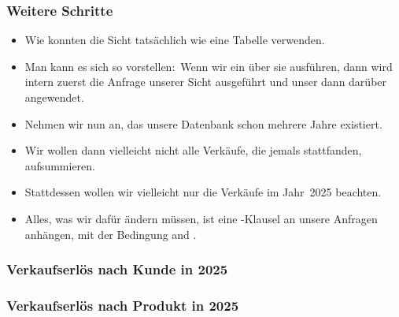 \documentclass[aspectratio=169,mathserif,notheorems]{beamer}%
\begin{document}
\begin{frame}%
\frametitle{Weitere Schritte}%
\begin{itemize}%
\item Wie konnten die Sicht tatsächlich wie eine Tabelle verwenden.%
\item<2-> Man kann es sich so vorstellen:~Wenn wir ein  über sie ausführen, dann wird intern zuerst die Anfrage unserer Sicht ausgeführt und unser  dann darüber angewendet.%
\item<3-> Nehmen wir nun an, das unsere Datenbank schon mehrere Jahre existiert.%
\item<4-> Wir wollen dann vielleicht nicht alle Verkäufe, die jemals stattfanden, aufsummieren.%
\item<5-> Stattdessen wollen wir vielleicht nur die Verkäufe im Jahr~2025 beachten.%
\item<6-> Alles, was wir dafür ändern müssen, ist eine -Klausel an unsere Anfragen anhängen, mit der Bedingung  and .%
\end{itemize}%
\end{frame}%
%
\begin{frame}[t]
\frametitle{Verkaufserlös nach Kunde in 2025}%
%
\end{frame}
%
\begin{frame}[t]
\frametitle{Verkaufserlös nach Produkt in 2025}%
%
\end{frame}
%
\end{document}
